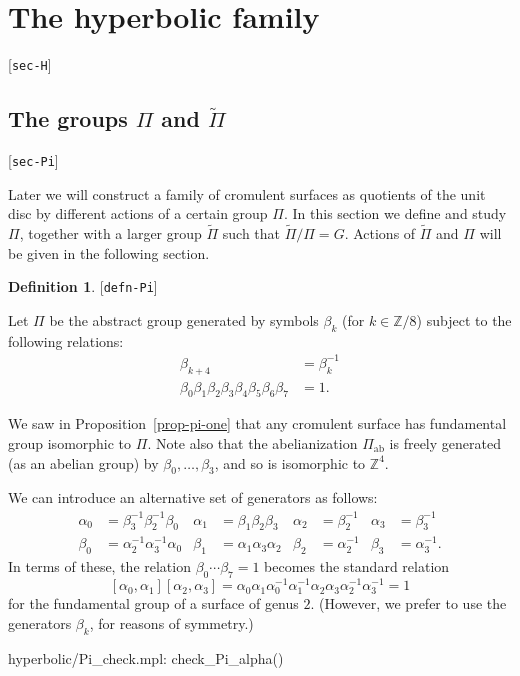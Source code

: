 \documentclass[reqno]{amsart}
\newcommand{\lbl}[1]{\label{#1}\textup{[\texttt{#1}]}\par}
\newcommand{\lbl}{\label}
\newcommand{\al}        {\alpha}
\newcommand{\bt}        {\beta}
\newcommand{\Z}         {{\mathbb{Z}}}
\newcommand{\tPi}	{\widetilde{\Pi}}
\renewcommand{\:}{\colon}
\theoremstyle{definition}
\newtheorem{definition}[theorem]{Definition}
\begin{document}
\section{The hyperbolic family}
\lbl{sec-H}

\subsection{The groups \texorpdfstring{$\Pi$ and $\tPi$}{Pi and Pi tilde}}
\lbl{sec-Pi}

Later we will construct a family of cromulent surfaces as quotients of
the unit disc by different actions of a certain group $\Pi$.  In this
section we define and study $\Pi$, together with a larger group $\tPi$
such that $\tPi/\Pi=G$.  Actions of $\tPi$ and $\Pi$ will be given in
the following section.

\begin{definition}\lbl{defn-Pi}
 Let $\Pi$ be the abstract group generated by symbols $\bt_k$ (for
 $k\in\Z/8$) subject to the following relations:
 \begin{align*}
  \bt_{k+4} &= \bt_k^{-1} \\
  \bt_0\bt_1\bt_2\bt_3\bt_4\bt_5\bt_6\bt_7 &= 1.
 \end{align*}
\end{definition}
We saw in Proposition~\ref{prop-pi-one} that any cromulent surface has
fundamental group isomorphic to $\Pi$.  Note also that the
abelianization $\Pi_{\text{ab}}$ is freely generated (as an abelian
group) by $\bt_0,\dotsc,\bt_3$, and so is isomorphic to $\Z^4$.

We can introduce an alternative set of generators as follows:
\begin{align*}
 \al_0 &= \bt_3^{-1}\bt_2^{-1}\bt_0 &
 \al_1 &= \bt_1\bt_2\bt_3 &
 \al_2 &= \bt_2^{-1} &
 \al_3 &= \bt_3^{-1} \\
 \bt_0 &= \al_2^{-1}\al_3^{-1}\al_0 &
 \bt_1 &= \al_1\al_3\al_2 &
 \bt_2 &= \al_2^{-1} &
 \bt_3 &= \al_3^{-1}.
\end{align*}
In terms of these, the relation $\bt_0\dotsb\bt_7=1$ becomes the
standard relation
\[ [\al_0,\al_1][\al_2,\al_3] =
    \al_0\al_1\al_0^{-1}\al_1^{-1}
    \al_2\al_3\al_2^{-1}\al_3^{-1} = 1
\]
for the fundamental group of a surface of genus $2$.  (However, we
prefer to use the generators $\bt_k$, for reasons of symmetry.)
\begin{checks}
 hyperbolic/Pi_check.mpl: check_Pi_alpha()
\end{checks}
\end{document}
